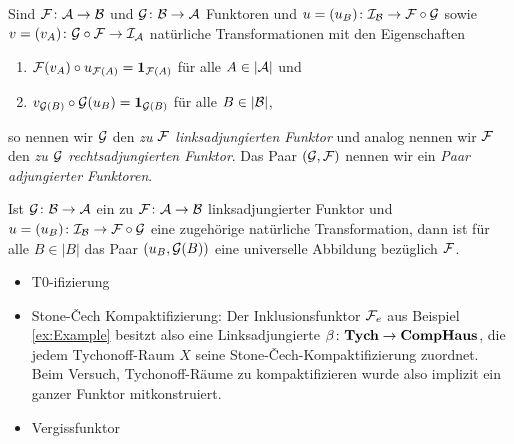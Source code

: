 \begin{defn}
  Sind $\mathcal{F} \colon \mathcal{A} \to \mathcal{B}$ und $\mathcal{G} \colon \mathcal{B} \to \mathcal{A}$ Funktoren und $u = (u_B) \colon \mathcal{I}_{\mathcal{B}} \to \mathcal{F} \circ \mathcal{G}$ sowie $v = (v_A) \colon \mathcal{G} \circ \mathcal{F} \to \mathcal{I}_{\mathcal{A}}$ natürliche Transformationen mit den Eigenschaften
  \begin{enumerate}[(1)]
    \item $\mathcal{F}(v_A) \circ u_{\mathcal{F}(A)} = \mathbf{1}_{\mathcal{F}(A)}$ für alle $A \in |\mathcal{A}|$ und
    \item $v_{\mathcal{G}(B)} \circ \mathcal{G}(u_B) = \mathbf{1}_{\mathcal{G}(B)}$ für alle $B \in |\mathcal{B}|$,
  \end{enumerate}
  so nennen wir $\mathcal{G}$ den \emph{zu $\mathcal{F}$ linksadjungierten Funktor} und analog nennen wir $\mathcal{F}$ den \emph{zu $\mathcal{G}$ rechtsadjungierten Funktor}.
  Das Paar $(\mathcal{G}, \mathcal{F})$ nennen wir ein \emph{Paar adjungierter Funktoren}.
\end{defn}

\begin{thm}
  Ist $\mathcal{G} \colon \mathcal{B} \to \mathcal{A}$ ein zu $\mathcal{F} \colon \mathcal{A} \to \mathcal{B}$ linksadjungierter Funktor und $u = (u_B) \colon \mathcal{I}_{\mathcal{B}} \to \mathcal{F} \circ \mathcal{G}$ eine zugehörige natürliche Transformation, dann ist für alle $B \in |B|$ das Paar $(u_B, \mathcal{G}(B))$ eine universelle Abbildung bezüglich $\mathcal{F}$.
\end{thm}

\begin{bem}
    
\end{bem}

\begin{ex}
  \begin{itemize}
    \item T0-ifizierung
    \item Stone-\v{C}ech Kompaktifizierung: Der Inklusionsfunktor $\mathcal{F}_e$ aus Beispiel \ref{ex:Example} besitzt also eine Linksadjungierte $\beta \colon \mathbf{Tych} \to \mathbf{CompHaus}$, die jedem Tychonoff-Raum $X$ seine Stone-\v{C}ech-Kompaktifizierung zuordnet. Beim Versuch, Tychonoff-Räume zu kompaktifizieren wurde also implizit ein ganzer Funktor mitkonstruiert.
    \item Vergissfunktor
  \end{itemize}
\end{ex}


